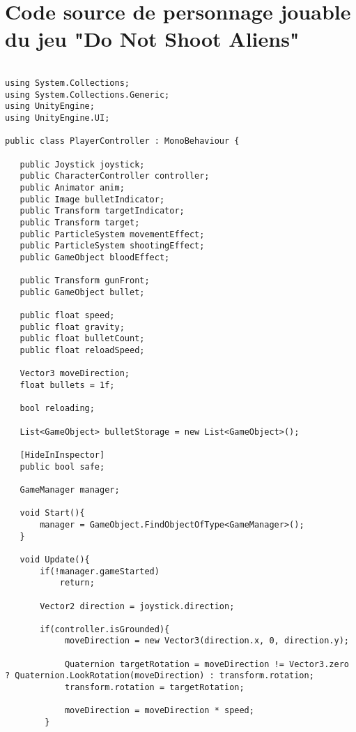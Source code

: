 
\chapter{Code source de personnage jouable du jeu "Do Not Shoot Aliens"} %

\label{AppendixA} %


\begin{lstlisting}[language=Csh]

using System.Collections;
using System.Collections.Generic;
using UnityEngine;
using UnityEngine.UI;

public class PlayerController : MonoBehaviour {
	
   public Joystick joystick;
   public CharacterController controller;
   public Animator anim;
   public Image bulletIndicator;
   public Transform targetIndicator;
   public Transform target;
   public ParticleSystem movementEffect;
   public ParticleSystem shootingEffect;
   public GameObject bloodEffect;
   
   public Transform gunFront;
   public GameObject bullet;
   
   public float speed;
   public float gravity;
   public float bulletCount;
   public float reloadSpeed;
   
   Vector3 moveDirection;
   float bullets = 1f;
   
   bool reloading;
   
   List<GameObject> bulletStorage = new List<GameObject>();
   
   [HideInInspector]
   public bool safe;
   
   GameManager manager;
   
   void Start(){
	   manager = GameObject.FindObjectOfType<GameManager>();
   }
   
   void Update(){
	   if(!manager.gameStarted)
		   return;
	   
	   Vector2 direction = joystick.direction;
	   
	   if(controller.isGrounded){
            moveDirection = new Vector3(direction.x, 0, direction.y);
			
			Quaternion targetRotation = moveDirection != Vector3.zero ? Quaternion.LookRotation(moveDirection) : transform.rotation;
			transform.rotation = targetRotation;
	
            moveDirection = moveDirection * speed;
        }


\end{lstlisting}
